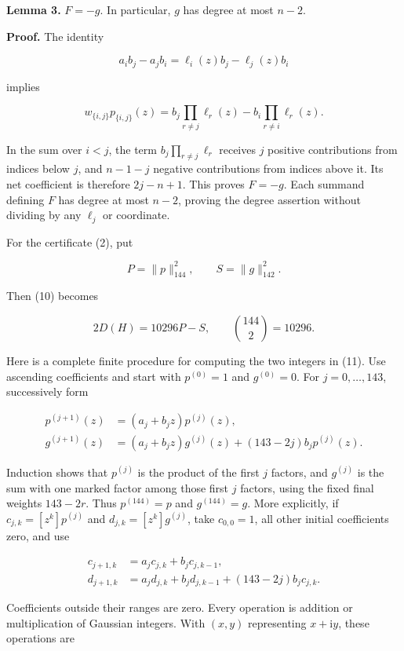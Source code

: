 \documentclass[10pt,a4paper]{article}
\begin{document}
\textbf{Lemma 3.} \(F=-g\). In particular, \(g\) has degree at most
\(n-2\).

\textbf{Proof.} The identity

\nopagebreak[4]
\[
a_i b_j-a_j b_i=\ell_i(z)b_j-\ell_j(z)b_i
\]

implies

\nopagebreak[4]
\[
w_{\{i,j\}}p_{\{i,j\}}(z)
=b_j\prod_{r\ne j}\ell_r(z)-b_i\prod_{r\ne i}\ell_r(z).
\]

In the sum over \(i<j\), the term \(b_j\prod_{r\ne j}\ell_r\) receives
\(j\) positive contributions from indices below \(j\), and \(n-1-j\)
negative contributions from indices above it. Its net coefficient is
therefore \(2j-n+1\). This proves \(F=-g\). Each summand defining \(F\)
has degree at most \(n-2\), proving the degree assertion without
dividing by any \(\ell_j\) or coordinate.

For the certificate (2), put

\nopagebreak[4]
\[
P=\|p\|_{144}^2,\qquad S=\|g\|_{142}^2.
\]

Then (10) becomes

\nopagebreak[4]
\[
2D(H)=10296P-S,\qquad \binom{144}{2}=10296.
\tag{11}
\]

Here is a complete finite procedure for computing the two integers in
(11). Use ascending coefficients and start with \(p^{(0)}=1\) and
\(g^{(0)}=0\). For \(j=0,\ldots,143\), successively form

\nopagebreak[4]
\[
\begin{aligned}
p^{(j+1)}(z)&=(a_j+b_jz)p^{(j)}(z),\\
g^{(j+1)}(z)&=(a_j+b_jz)g^{(j)}(z)
                    +(143-2j)b_jp^{(j)}(z).
\end{aligned}
\tag{12}
\]

Induction shows that \(p^{(j)}\) is the product of the first \(j\)
factors, and \(g^{(j)}\) is the sum with one marked factor among those
first \(j\) factors, using the fixed final weights \(143-2r\). Thus
\(p^{(144)}=p\) and \(g^{(144)}=g\). More explicitly, if
\(c_{j,k}=[z^k]p^{(j)}\) and \(d_{j,k}=[z^k]g^{(j)}\), take
\(c_{0,0}=1\), all other initial coefficients zero, and use

\nopagebreak[4]
\[
\begin{aligned}
c_{j+1,k}&=a_jc_{j,k}+b_jc_{j,k-1},\\
d_{j+1,k}&=a_jd_{j,k}+b_jd_{j,k-1}
                          +(143-2j)b_jc_{j,k}.
\end{aligned}
\]

Coefficients outside their ranges are zero. Every operation is addition
or multiplication of Gaussian integers. With \((x,y)\) representing
\(x+\mathrm{i}y\), these operations are
\end{document}

